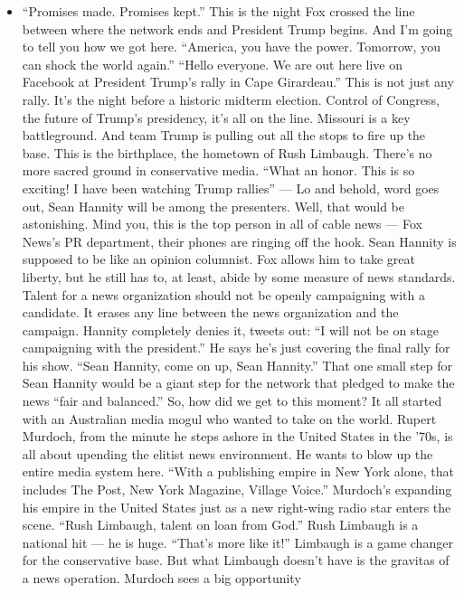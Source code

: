 \begin{itemize}
\tightlist
\item
  ``Promises made. Promises kept.'' This is the night Fox crossed the
  line between where the network ends and President Trump begins. And
  I'm going to tell you how we got here. ``America, you have the power.
  Tomorrow, you can shock the world again.'' ``Hello everyone. We are
  out here live on Facebook at President Trump's rally in Cape
  Girardeau.'' This is not just any rally. It's the night before a
  historic midterm election. Control of Congress, the future of Trump's
  presidency, it's all on the line. Missouri is a key battleground. And
  team Trump is pulling out all the stops to fire up the base. This is
  the birthplace, the hometown of Rush Limbaugh. There's no more sacred
  ground in conservative media. ``What an honor. This is so exciting! I
  have been watching Trump rallies'' --- Lo and behold, word goes out,
  Sean Hannity will be among the presenters. Well, that would be
  astonishing. Mind you, this is the top person in all of cable news ---
  Fox News's PR department, their phones are ringing off the hook. Sean
  Hannity is supposed to be like an opinion columnist. Fox allows him to
  take great liberty, but he still has to, at least, abide by some
  measure of news standards. Talent for a news organization should not
  be openly campaigning with a candidate. It erases any line between the
  news organization and the campaign. Hannity completely denies it,
  tweets out: ``I will not be on stage campaigning with the president.''
  He says he's just covering the final rally for his show. ``Sean
  Hannity, come on up, Sean Hannity.'' That one small step for Sean
  Hannity would be a giant step for the network that pledged to make the
  news ``fair and balanced.'' So, how did we get to this moment? It all
  started with an Australian media mogul who wanted to take on the
  world. Rupert Murdoch, from the minute he steps ashore in the United
  States in the '70s, is all about upending the elitist news
  environment. He wants to blow up the entire media system here. ``With
  a publishing empire in New York alone, that includes The Post, New
  York Magazine, Village Voice.'' Murdoch's expanding his empire in the
  United States just as a new right-wing radio star enters the scene.
  ``Rush Limbaugh, talent on loan from God.'' Rush Limbaugh is a
  national hit --- he is huge. ``That's more like it!'' Limbaugh is a
  game changer for the conservative base. But what Limbaugh doesn't have
  is the gravitas of a news operation. Murdoch sees a big opportunity

\end{itemize}
